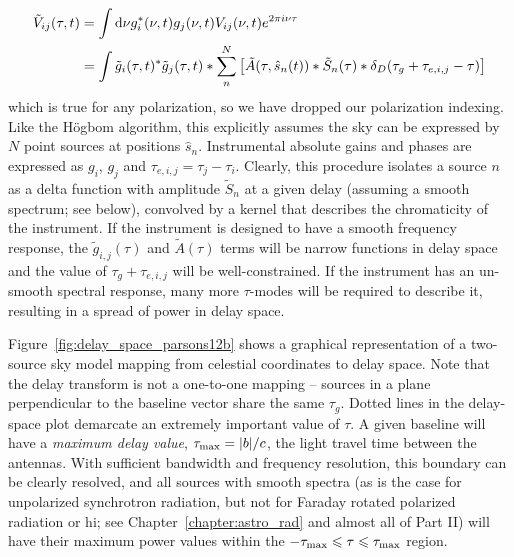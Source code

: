 \begin{equation}
\begin{split}
\tilde{V}_{ij}(\tau, t) &= \int {\rm d}\nu g_i^*(\nu, t)g_j(\nu, t) V_{ij}(\nu,t)e^{2\pi i \nu \tau} \\
								   &= \int \tilde{g}_i(\tau, t)^*\tilde{g}_j(\tau, t) *
								   \sum_n^N \left[ \tilde{A}(\tau,\hat{s}_n(t)) * \tilde{S}_n(\tau) * \delta_D(\tau_g + \tau_{e,i,j} - \tau)\right]
\end{split}		   
\end{equation}
which is true for any polarization, so we have dropped our polarization indexing. Like the H{\"o}gbom algorithm, this explicitly assumes the sky can be expressed by $N$ point sources at positions $\hat{s}_n$. Instrumental absolute gains and phases are expressed as $g_i$, $g_j$ and $\tau_{e,i,j}= \tau_j - \tau_i$. Clearly, this procedure isolates a source $n$ as a delta function with amplitude $\tilde{S}_n$ at a given delay (assuming a smooth spectrum; see below), convolved by a kernel that describes the chromaticity of the instrument. If the instrument is designed to have a smooth frequency response, the $\tilde{g}_{i,j}(\tau)$ and $\tilde{A}(\tau)$ terms will be narrow functions in delay space and the value of $\tau_g + \tau_{e,i,j}$ will be well-constrained. If the instrument has an un-smooth spectral response, many more $\tau$-modes will be required to describe it, resulting in a spread of power in delay space. 

Figure~\ref{fig:delay_space_parsons12b} shows a graphical representation of a two-source sky model mapping from celestial coordinates to delay space. Note that the delay transform is not a one-to-one mapping -- sources in a plane perpendicular to the baseline vector share the same $\tau_g$. Dotted lines in the delay-space plot demarcate an extremely important value of $\tau$. A given baseline will have a \textit{maximum delay value}, $\tau_{\rm max} = |b|/c$, the light travel time between the antennas. With sufficient bandwidth and frequency resolution, this boundary can be clearly resolved, and all sources with smooth spectra (as is the case for unpolarized synchrotron radiation, but not for Faraday rotated polarized radiation or {\sc hi}; see Chapter~\ref{chapter:astro_rad} and almost all of Part II) will have their maximum power values within the $-\tau_{\rm max} \leqslant \tau \leqslant \tau_{\rm max}$ region.

